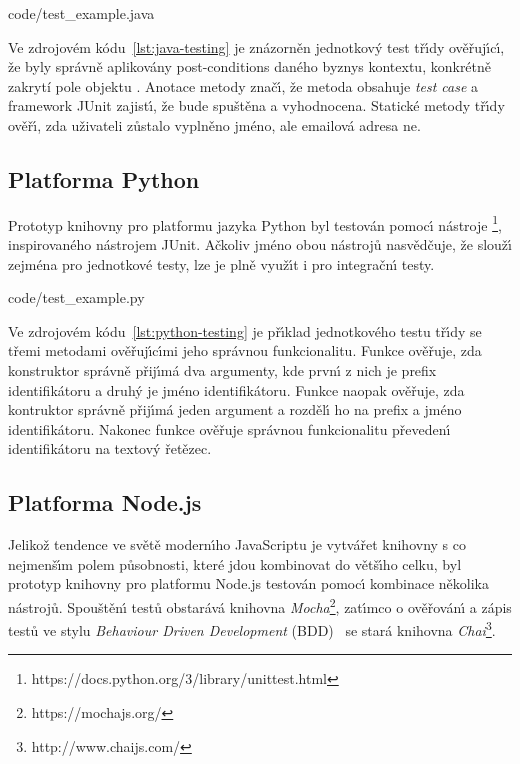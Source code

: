 
{code/test_example.java}

Ve zdrojovém kódu~\ref{lst:java-testing} je znázorněn jednotkov\'y test
tř\'{\i}dy  ověřuj\'{\i}c\'{\i},
že byly správně aplikovány post-conditions daného byznys kontextu, konkrétně
zakrytí pole  objektu . Anotace  metody  znač\'{\i},
že metoda obsahuje \textit{test case} a framework JUnit zajist\'{\i}, že bude spuštěna
a vyhodnocena. Statické metody tř\'{\i}dy  ověř\'{\i}, zda uživateli zůstalo
vyplněno jméno, ale emailová adresa ne.

\subsection{Platforma Python}

Prototyp knihovny pro platformu jazyka Python byl testován pomoc\'{\i}
nástroje \footnote{https://docs.python.org/3/library/unittest.html}, inspirovaného nástrojem
JUnit. Ačkoliv jméno obou nástrojů nasvědčuje, že slouž\'{\i} zejména pro jednotkové testy,
lze je plně využ\'{\i}t i pro integračn\'{\i} testy.


{code/test_example.py}

Ve zdrojovém kódu~\ref{lst:python-testing} je př\'{\i}klad jednotkového testu tř\'{\i}dy
 se třemi metodami ověřuj\'{\i}c\'{\i}mi jeho správnou funkcionalitu.
Funkce  ověřuje, zda konstruktor správně přij\'{\i}má dva argumenty,
kde prvn\'{\i} z nich je prefix identifikátoru a druh\'y je jméno identifikátoru.
Funkce  naopak ověřuje, zda kontruktor správně přij\'{\i}má jeden
argument a rozděl\'{\i} ho na prefix a jméno identifikátoru.
Nakonec funkce  ověřuje správnou funkcionalitu převeden\'{\i}
identifikátoru na textov\'y řetězec.

\subsection{Platforma Node.js}

Jelikož tendence ve světě modern\'{\i}ho JavaScriptu je vytvářet knihovny s co nejmenš\'{\i}m polem působnosti,
které jdou kombinovat do větš\'{\i}ho celku, byl prototyp knihovny pro platformu Node.js testován pomoc\'{\i}
kombinace několika nástrojů. Spouštěn\'{\i} testů obstarává knihovna \textit{Mocha}\footnote{https://mochajs.org/}, zat\'{\i}mco
o ověřován\'{\i} a zápis testů ve stylu \textit{Behaviour Driven Development} (\gls{BDD})~\cite{solis2011study}
se stará knihovna \textit{Chai}\footnote{http://www.chaijs.com/}.

